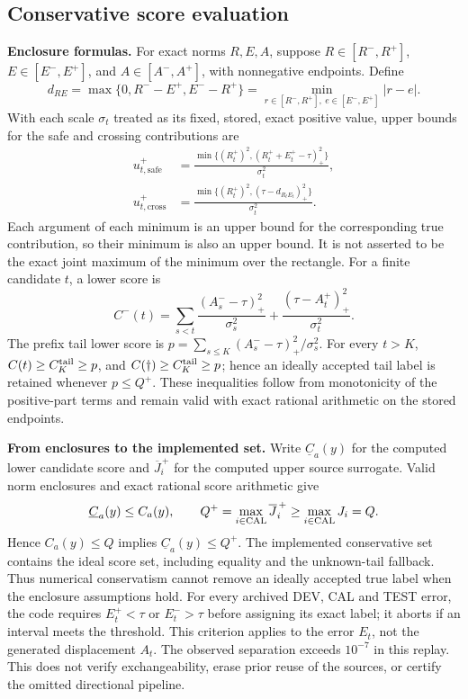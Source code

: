 \documentclass[11pt]{article}
\theoremstyle{noteplain}
\newcommand{\dd}{\dagger}
\begin{document}
\subsection*{Conservative score evaluation}
\textbf{Enclosure formulas.} For exact norms $R,E,A$, suppose $R\in[R^-,R^+]$, $E\in[E^-,E^+]$, and $A\in[A^-,A^+]$, with nonnegative endpoints. Define
\[
 d_{RE}=\max\{0,R^- - E^+,E^- - R^+\}
       =\min_{r\in[R^-,R^+],\ e\in[E^-,E^+]}|r-e|.
\]
With each scale $\sigma_t$ treated as its fixed, stored, exact positive value, upper bounds for the safe and crossing contributions are
\begin{align*}
 u_{t,\mathrm{safe}}^+&=\frac{\min\{(R_t^+)^2,(R_t^++E_t^+-\tau)_+^2\}}{\sigma_t^2},\\
 u_{t,\mathrm{cross}}^+&=\frac{\min\{(R_t^+)^2,(\tau-d_{R_tE_t})_+^2\}}{\sigma_t^2}.
\end{align*}
Each argument of each minimum is an upper bound for the corresponding true contribution, so their minimum is also an upper bound. It is not asserted to be the exact joint maximum of the minimum over the rectangle. For a finite candidate $t$, a lower score is
\[
 C^-(t)=\sum_{s<t}\frac{(A_s^- -\tau)_+^2}{\sigma_s^2}
       +\frac{(\tau-A_t^+)_+^2}{\sigma_t^2}.
\]
The prefix tail lower score is $p=\sum_{s\le K}(A_s^- -\tau)_+^2/\sigma_s^2$. For every $t>K$, $C(t)\ge C_K^{\rm tail}\ge p$, and $C(\dd)\ge C_K^{\rm tail}\ge p$; hence an ideally accepted tail label is retained whenever $p\le Q^+$. These inequalities follow from monotonicity of the positive-part terms and remain valid with exact rational arithmetic on the stored endpoints.

\textbf{From enclosures to the implemented set.}
Write $\underline C_a(y)$ for the computed lower candidate score and $\overline J_i^{\,+}$ for the computed upper source surrogate. Valid norm enclosures and exact rational score arithmetic give
\[
 \underline C_a(y)\le C_a(y),\qquad
 Q^+=\max_{i\in{\rm CAL}}\overline J_i^{\,+}
       \ge\max_{i\in{\rm CAL}}J_i=Q.
\]
Hence $C_a(y)\le Q$ implies $\underline C_a(y)\le Q^+$. The implemented conservative set contains the ideal score set, including equality and the unknown-tail fallback. Thus numerical conservatism cannot remove an ideally accepted true label when the enclosure assumptions hold. For every archived DEV, CAL and TEST error, the code requires $E_t^+<\tau$ or $E_t^->\tau$ before assigning its exact label; it aborts if an interval meets the threshold. This criterion applies to the error $E_t$, not the generated displacement $A_t$. The observed separation exceeds $10^{-7}$ in this replay. This does not verify exchangeability, erase prior reuse of the sources, or certify the omitted directional pipeline.
\end{document}
